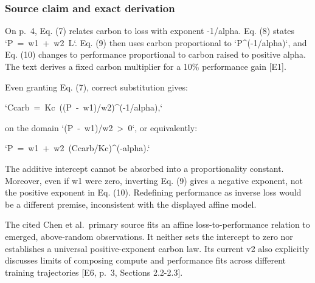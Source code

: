 \documentclass[10pt]{article}
\begin{document}
\subsubsection*{Source claim and exact derivation}
On p. 4, Eq. (7) relates carbon to loss with exponent -1/alpha. Eq. (8) states `P = w1 + w2 L`. Eq. (9) then uses carbon proportional to `P\textasciicircum{}(-1/alpha)`, and Eq. (10) changes to performance proportional to carbon raised to positive alpha. The text derives a fixed carbon multiplier for a 10\% performance gain [E1].\par
Even granting Eq. (7), correct substitution gives:\par
`Ccarb = Kc ((P - w1)/w2)\textasciicircum{}(-1/alpha),`\par
on the domain `(P - w1)/w2 > 0`, or equivalently:\par
`P = w1 + w2 (Ccarb/Kc)\textasciicircum{}(-alpha).`\par
The additive intercept cannot be absorbed into a proportionality constant. Moreover, even if w1 were zero, inverting Eq. (9) gives a negative exponent, not the positive exponent in Eq. (10). Redefining performance as inverse loss would be a different premise, inconsistent with the displayed affine model.\par
The cited Chen et al. primary source fits an affine loss-to-performance relation to emerged, above-random observations. It neither sets the intercept to zero nor establishes a universal positive-exponent carbon law. Its current v2 also explicitly discusses limits of composing compute and performance fits across different training trajectories [E6, p. 3, Sections 2.2-2.3].\par
\end{document}
